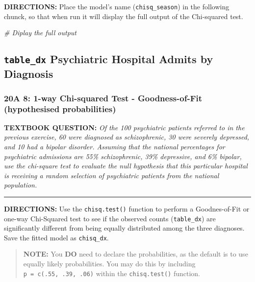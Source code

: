 \documentclass[
]{article}
\newenvironment{Shaded}{\begin{snugshade}}{\end{snugshade}}
\newcommand{\CommentTok}[1]{\textcolor[rgb]{0.56,0.35,0.01}{\textit{#1}}}
\begin{document}
\textbf{DIRECTIONS:} Place the model's name (\texttt{chisq\_season}) in
the following chunck, so that when run it will display the full output
of the Chi-squared test.

\begin{Shaded}
\begin{Highlighting}[]
\CommentTok{\# Diplay the full output}
\end{Highlighting}
\end{Shaded}

\clearpage

\hypertarget{table_dx-psychiatric-hospital-admits-by-diagnosis}{%
\subsection{\texorpdfstring{\texttt{table\_dx} Psychiatric Hospital
Admits by
Diagnosis}{table\_dx Psychiatric Hospital Admits by Diagnosis}}\label{table_dx-psychiatric-hospital-admits-by-diagnosis}}

\hypertarget{a-8-1-way-chi-squared-test---goodness-of-fit-hypothesised-probabilities}{%
\subsubsection{20A 8: 1-way Chi-squared Test - Goodness-of-Fit
(hypothesised
probabilities)}\label{a-8-1-way-chi-squared-test---goodness-of-fit-hypothesised-probabilities}}

\textbf{TEXTBOOK QUESTION:} \emph{Of the 100 psychiatric patients
referred to in the previous exercise, 60 were diagnosed as
schizophrenic, 30 were severely depressed, and 10 had a bipolar
disorder. Assuming that the national percentages for psychiatric
admissions are 55\% schizophrenic, 39\% depressive, and 6\% bipolar, use
the chi-square test to evaluate the null hypothesis that this particular
hospital is receiving a random selection of psychiatric patients from
the national population.}

\begin{center}\rule{0.5\linewidth}{0.5pt}\end{center}

\textbf{DIRECTIONS:} Use the \texttt{chisq.test()} function to perform a
Goodnes-of-Fit or one-way Chi-Squared test to see if the observed counts
(\texttt{table\_dx}) are significantly different from being equally
distributed among the three diagnoses. Save the fitted model as
\texttt{chisq\_dx}.

\begin{quote}
\textbf{NOTE:} You \textbf{DO} need to declare the probabilities, as the
default is to use equally likely probabilities. You may do this by
including \texttt{p\ =\ c(.55,\ .39,\ .06)} within the
\texttt{chisq.test()} function.
\end{quote}
\end{document}
